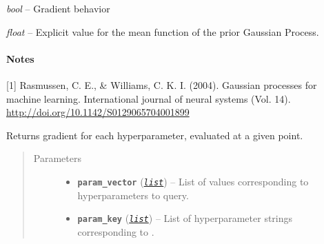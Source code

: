 \documentclass[letterpaper,10pt,english]{sphinxmanual}
\begin{document}
\begin{fulllineitems}
\begin{fulllineitems}
\end{fulllineitems}


\begin{fulllineitems}
\label{pyGPGO.surrogates.GaussianProcess:pyGPGO.surrogates.GaussianProcess.GaussianProcess.usegrads}
\emph{bool} -- Gradient behavior

\end{fulllineitems}


\begin{fulllineitems}
\label{pyGPGO.surrogates.GaussianProcess:pyGPGO.surrogates.GaussianProcess.GaussianProcess.mprior}
\emph{float} -- Explicit value for the mean function of the prior Gaussian Process.

\end{fulllineitems}

\paragraph{Notes}

{[}1{]} Rasmussen, C. E., \& Williams, C. K. I. (2004). Gaussian processes for machine learning.
International journal of neural systems (Vol. 14). \url{http://doi.org/10.1142/S0129065704001899}

\begin{fulllineitems}
\label{pyGPGO.surrogates.GaussianProcess:pyGPGO.surrogates.GaussianProcess.GaussianProcess._grad}
Returns gradient for each hyperparameter, evaluated at a given point.
\begin{quote}\begin{description}
\item[{Parameters}] \leavevmode\begin{itemize}
\item {} 
\textbf{\texttt{param\_vector}} (\href{https://docs.python.org/2/library/functions.html\#list}{\emph{\texttt{list}}}) -- List of values corresponding to hyperparameters to query.

\item {} 
\textbf{\texttt{param\_key}} (\href{https://docs.python.org/2/library/functions.html\#list}{\emph{\texttt{list}}}) -- List of hyperparameter strings corresponding to .


\end{itemize}
\end{description}
\end{quote}
\end{fulllineitems}
\end{fulllineitems}
\end{document}
